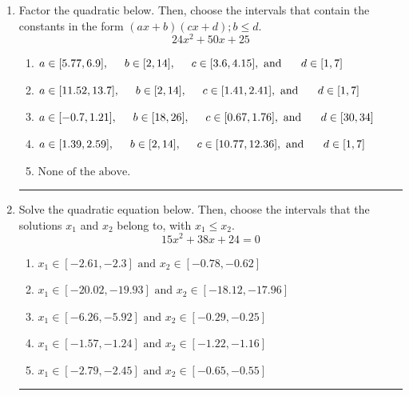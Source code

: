 \documentclass[14pt]{extbook}
\newcommand{\litem}[1]{\item#1\hspace*{-1cm}\rule{\textwidth}{0.4pt}}
\begin{document}
\begin{enumerate}
{\begin{enumerate}[label=\Alph*.]
\end{enumerate} }
\litem{
Factor the quadratic below. Then, choose the intervals that contain the constants in the form $(ax+b)(cx+d); b \leq d.$\[ 24x^{2} +50 x + 25 \]\begin{enumerate}[label=\Alph*.]
\item \( a \in [5.77, 6.9], \hspace*{5mm} b \in [2, 14], \hspace*{5mm} c \in [3.6, 4.15], \text{ and } \hspace*{5mm} d \in [1, 7] \)
\item \( a \in [11.52, 13.7], \hspace*{5mm} b \in [2, 14], \hspace*{5mm} c \in [1.41, 2.41], \text{ and } \hspace*{5mm} d \in [1, 7] \)
\item \( a \in [-0.7, 1.21], \hspace*{5mm} b \in [18, 26], \hspace*{5mm} c \in [0.67, 1.76], \text{ and } \hspace*{5mm} d \in [30, 34] \)
\item \( a \in [1.39, 2.59], \hspace*{5mm} b \in [2, 14], \hspace*{5mm} c \in [10.77, 12.36], \text{ and } \hspace*{5mm} d \in [1, 7] \)
\item \( \text{None of the above.} \)

\end{enumerate} }
\litem{
Solve the quadratic equation below. Then, choose the intervals that the solutions $x_1$ and $x_2$ belong to, with $x_1 \leq x_2$.\[ 15x^{2} +38 x + 24 = 0 \]\begin{enumerate}[label=\Alph*.]
\item \( x_1 \in [-2.61, -2.3] \text{ and } x_2 \in [-0.78, -0.62] \)
\item \( x_1 \in [-20.02, -19.93] \text{ and } x_2 \in [-18.12, -17.96] \)
\item \( x_1 \in [-6.26, -5.92] \text{ and } x_2 \in [-0.29, -0.25] \)
\item \( x_1 \in [-1.57, -1.24] \text{ and } x_2 \in [-1.22, -1.16] \)
\item \( x_1 \in [-2.79, -2.45] \text{ and } x_2 \in [-0.65, -0.55] \)


\end{enumerate}}
\end{enumerate}
\end{document}
